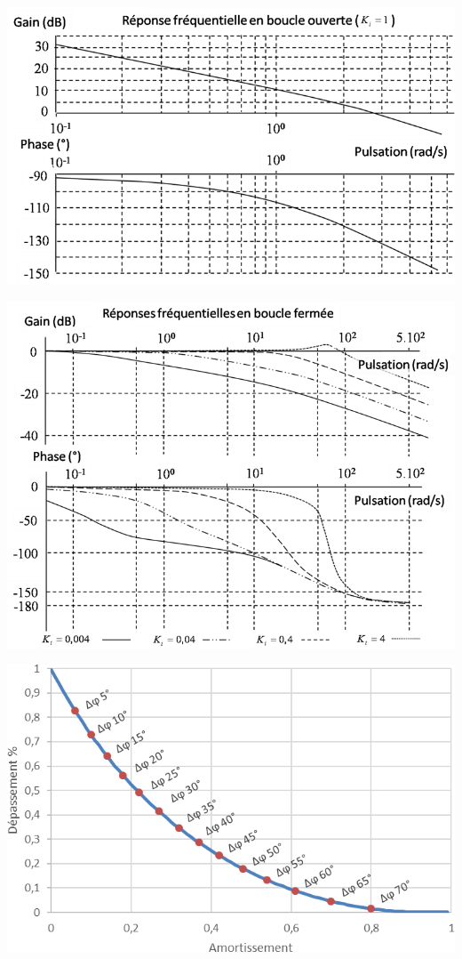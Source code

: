 \documentclass[10pt,fleqn]{article} %
\begin{document}
\begin{multicols}{2}
\begin{center}
\includegraphics[width=\linewidth]{images/bo}
\end{center}

\begin{center}
\includegraphics[width=\linewidth]{images/bf}
\end{center}

\begin{center}
\includegraphics[width=\linewidth]{images/abaque}
\end{center}


\end{multicols}
\end{document}
